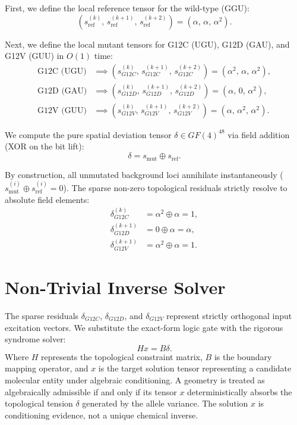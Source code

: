 \documentclass[11pt]{article}
\begin{document}
First, we define the local reference tensor for the wild-type (GGU):
\begin{equation}
(s_{\mathrm{ref}}^{(k)},\, s_{\mathrm{ref}}^{(k+1)},\, s_{\mathrm{ref}}^{(k+2)})
= (\alpha,\,\alpha,\,\alpha^2).
\end{equation}

Next, we define the local mutant tensors for G12C (UGU), G12D (GAU), and
G12V (GUU) in \(O(1)\) time:
\begin{align}
\text{G12C (UGU)}
&\implies
(s_{G12C}^{(k)},\, s_{G12C}^{(k+1)},\, s_{G12C}^{(k+2)})
= (\alpha^2,\,\alpha,\,\alpha^2), \\
\text{G12D (GAU)}
&\implies
(s_{G12D}^{(k)},\, s_{G12D}^{(k+1)},\, s_{G12D}^{(k+2)})
= (\alpha,\,0,\,\alpha^2), \\
\text{G12V (GUU)}
&\implies
(s_{G12V}^{(k)},\, s_{G12V}^{(k+1)},\, s_{G12V}^{(k+2)})
= (\alpha,\,\alpha^2,\,\alpha^2).
\end{align}

We compute the pure spatial deviation tensor \(\delta\in GF(4)^{48}\) via
field addition (XOR on the bit lift):
\begin{equation}
\delta = s_{\mathrm{mut}} \oplus s_{\mathrm{ref}}.
\end{equation}

By construction, all unmutated background loci annihilate instantaneously
(\(s_{\mathrm{mut}}^{(i)}\oplus s_{\mathrm{ref}}^{(i)}=0\)). The sparse non-zero
topological residuals strictly resolve to absolute field elements:
\begin{align}
\delta_{G12C}^{(k)} &= \alpha^2 \oplus \alpha = 1, \\
\delta_{G12D}^{(k+1)} &= 0 \oplus \alpha = \alpha, \\
\delta_{G12V}^{(k+1)} &= \alpha^2 \oplus \alpha = 1.
\end{align}

\section{Non-Trivial Inverse Solver}
The sparse residuals \(\delta_{G12C}\), \(\delta_{G12D}\), and \(\delta_{G12V}\)
represent strictly orthogonal input excitation vectors. We substitute the
exact-form logic gate with the rigorous syndrome solver:
\begin{equation}
Hx = B\delta.
\end{equation}
Where \(H\) represents the topological constraint matrix, \(B\) is the boundary
mapping operator, and \(x\) is the target solution tensor representing a
candidate molecular entity under algebraic conditioning. A geometry is treated
as algebraically admissible if and only if its tensor \(x\) deterministically
absorbs the topological tension \(\delta\) generated by the allele variance.
The solution \(x\) is conditioning evidence, not a unique chemical inverse.
\end{document}
